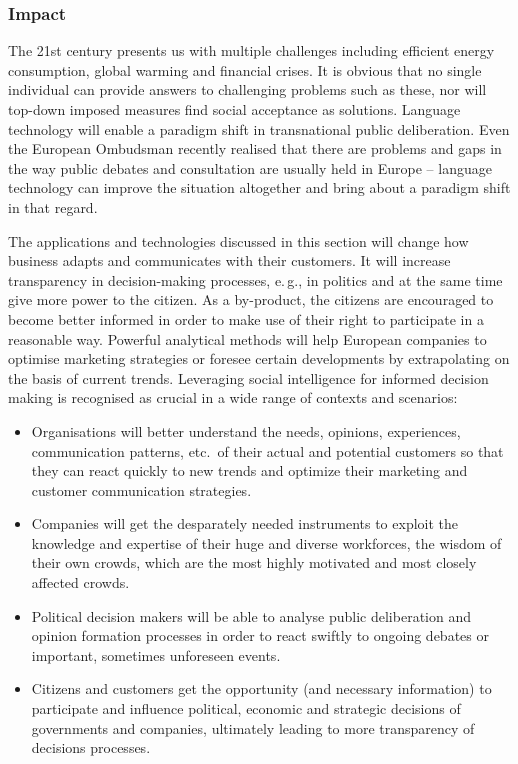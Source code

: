 \documentclass[10pt, plain]{../../metanetpaper}
\begin{document}
\begin{multicols}{2}
\subsubsection{Impact}
\label{sec:impact-pt2}

The 21st century presents us with multiple challenges including efficient energy consumption, global warming and financial crises. It is obvious that no single individual can provide answers to challenging problems such as these, nor will top-down imposed measures find social acceptance as solutions. Language technology will enable a paradigm shift in transnational public deliberation. Even the European Ombudsman recently realised \cite{ombudsman2012} that there are problems and gaps in the way public debates and consultation are usually held in Europe -- language technology can improve the situation altogether and bring about a paradigm shift in that regard.
 
The applications and technologies discussed in this section will change how business adapts and communicates with their customers. It will increase transparency in decision-making processes, e.\,g., in politics and at the same time give more power to the citizen. As a by-product, the citizens are encouraged to become better informed in order to make use of their right to participate in a reasonable way. Powerful analytical methods will help European companies to optimise marketing strategies or foresee certain developments by extrapolating on the basis of current trends. Leveraging social intelligence for informed decision making is recognised as crucial in a wide range of contexts and scenarios:

\begin{itemize}
\item Organisations will better understand the needs, opinions, experiences, communication patterns, etc.~of their actual and potential customers so that they can react quickly to new trends and optimize their marketing and customer communication strategies.
\item Companies will get the desparately needed instruments to exploit the knowledge and expertise of their huge and diverse workforces, the wisdom of their own crowds, which are the most highly motivated and most closely affected crowds.
\item Political decision makers will be able to analyse public deliberation and opinion formation processes in order to react swiftly to ongoing debates or important, sometimes unforeseen events.
\item Citizens and customers get the opportunity (and necessary information) to participate and influence political, economic and strategic decisions of governments and companies, ultimately leading to more transparency of decisions processes.
\end{itemize}


\end{multicols}
\end{document}
